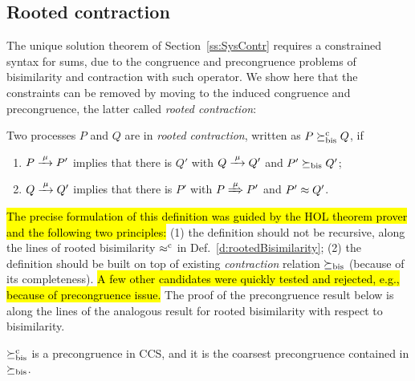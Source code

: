 \subsection{Rooted contraction}
\label{ss:new}

The unique solution theorem of Section~\ref{ss:SysContr} requires a
constrained syntax for sums, due to the congruence and precongruence
problems of bisimilarity and contraction with such operator. 
We show here that the constraints can be
removed by moving to the induced congruence and precongruence, the
latter called \emph{rooted contraction}:
\begin{definition}
\label{d:rcontra}
Two processes $P$ and $Q$ are in \emph{rooted contraction}, written as
 $P\mathrel{\succeq^{\rm{c}}_{\rm{bis}}} Q$, if
\begin{enumerate}
\item $P \arr\mu P'$ implies that there is $Q'$ with $Q \arr \mu Q'$
 and $P'\mathrel{\succeq_{\rm{bis}}} Q'$;
\item $Q \arr\mu Q'$   implies that there is $P'$ with $P \Arr \mu
 P'$ and $P' \approx Q'$.
\end{enumerate}
\end{definition}


\hl{The precise formulation of  this definition was guided by the HOL theorem
  prover and
the following two principles:} (1) the definition should not be recursive,
along the lines of rooted bisimilarity
$\mathrel{\approx^{\rm{c}}}$ in Def.~\ref{d:rootedBisimilarity};
(2) the definition should  be built on top of existing \emph{contraction}
relation $\mathrel{\succeq_{\rm{bis}}}$ (because of its completeness). 
\hl{A few other candidates were quickly tested and rejected, e.g.,
  because of  precongruence issue.} The proof of the precongruence
 result below is along the lines of the analogous result
for rooted bisimilarity with respect to bisimilarity.

\begin{theorem}
\label{t:rcontrPrecongruence}
$\mathrel{\succeq^{\rm{c}}_{\rm{bis}}}$ is a precongruence in CCS, and it is the
coarsest precongruence contained in $\mathrel{\succeq_{\rm{bis}}}$.
\end{theorem}  

